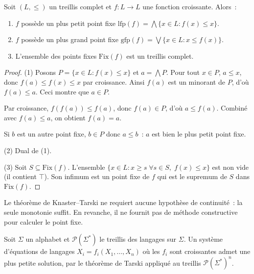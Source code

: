 \begin{theoreme}
\label{thm:knaster-tarski}
Soit $(L, \leq)$ un treillis complet et $f\colon L \to L$ une fonction croissante.
Alors~:
\begin{enumerate}
  \item $f$ poss\`ede un plus petit point fixe
    $\mathrm{lfp}(f) = \bigwedge \{x \in L : f(x) \leq x\}$.
  \item $f$ poss\`ede un plus grand point fixe
    $\mathrm{gfp}(f) = \bigvee \{x \in L : x \leq f(x)\}$.
  \item L'ensemble des points fixes $\mathrm{Fix}(f)$ est un treillis complet.
\end{enumerate}
\end{theoreme}

\begin{proof}
(1) Posons $P = \{x \in L : f(x) \leq x\}$ et $a = \bigwedge P$. Pour tout $x \in P$,
$a \leq x$, donc $f(a) \leq f(x) \leq x$ par croissance. Ainsi $f(a)$ est un minorant
de $P$, d'o\`u $f(a) \leq a$. Ceci montre que $a \in P$.

Par croissance, $f(f(a)) \leq f(a)$, donc $f(a) \in P$, d'o\`u $a \leq f(a)$. Combin\'e
avec $f(a) \leq a$, on obtient $f(a) = a$.

Si $b$ est un autre point fixe, $b \in P$ donc $a \leq b$~: $a$ est bien le plus petit
point fixe.

(2) Dual de (1).

(3) Soit $S \subseteq \mathrm{Fix}(f)$. L'ensemble $\{x \in L : x \geq s \; \forall s \in S,
\; f(x) \leq x\}$ est non vide (il contient $\top$). Son infimum est un point fixe de $f$
qui est le supremum de $S$ dans $\mathrm{Fix}(f)$.
\end{proof}

\begin{remarque}
Le th\'eor\`eme de Knaster--Tarski ne requiert aucune hypoth\`ese de continuit\'e~: la
seule monotonie suffit. En revanche, il ne fournit pas de m\'ethode constructive pour
calculer le point fixe.
\end{remarque}

\begin{exemple}
Soit $\Sigma$ un alphabet et $\mathcal{P}(\Sigma^*)$ le treillis des langages sur $\Sigma$.
Un syst\`eme d'\'equations de langages $X_i = f_i(X_1, \ldots, X_n)$ o\`u les $f_i$ sont
croissantes admet une plus petite solution, par le th\'eor\`eme de Tarski appliqu\'e au
treillis $\mathcal{P}(\Sigma^*)^n$.
\end{exemple}

